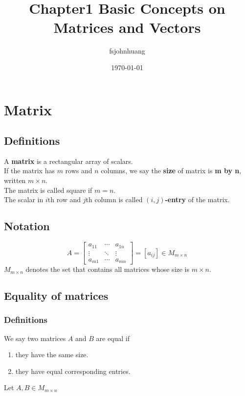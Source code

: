 \documentclass[12pt]{article}
\begin{document}
\tableofcontents
\title{Chapter1 Basic Concepts on Matrices and Vectors}
\author{fsjohnhuang}
\date{\today}
\maketitle

\section{Matrix}
\subsection{Definitions}
A \textbf{matrix} is a rectangular array of scalars.\\
If the matrix has $m$ rows and $n$ columns, we say the \textbf{size} of matrix is \textbf{m by n}, written $m \times n$.\\
The matrix is called square if $m = n$.\\
The scalar in $i$th row and $j$th column is called \textbf{$(i,j)$-entry} of the matrix.\\

\subsection{Notation}
\begin{equation}
	A =
	\left[
	\begin{array}{ccc}
	a_{11} & \cdots  & a_{1n} \\
	\vdots & \ddots & \vdots \\
	a_{m1} & \cdots  & a_{mn}
	\end{array}
	\right]
	= [a_{ij}] \in M_{m \times n}
\end{equation}
$M_{m \times n}$ denotes the set that contains all matrices whose size is $m \times n$.\\

\subsection{Equality of matrices}
\subsubsection{Definitions}
We say two matrices $A$ and $B$ are equal if
\begin{enumerate}
\item they have the same size.
\item they have equal corresponding entries.
\end{enumerate} 
Let $A,B \in M_{m \times n}$
\end{document}
